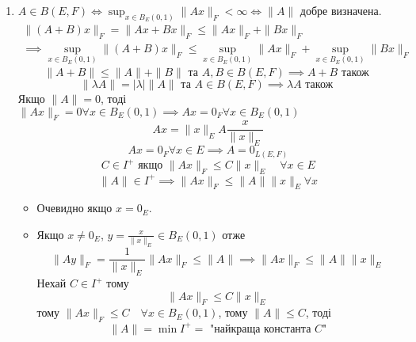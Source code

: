 \begin{preuve}
   \begin{enumerate}
       \item $A \in B(E, F) \iff \sup_{x \in B_{E}(0, 1)} \|Ax\|_{F} < \infty \iff \|A\|$ добре визначена.
           \begin{align*}
               \|(A + B)x\|_F = \|Ax + Bx\|_F \le \|Ax\|_F + \|Bx\|_F\\ \implies \sup_{x \in B_E(0, 1)} \|(A + B)x\|_F \le \sup_{x \in B_E(0, 1)} \|Ax\|_F + \sup_{x \in B_E(0, 1)} \|Bx\|_F
           \end{align*}
           \[
               \|A + B\| \le \|A\| + \|B\| \text{ та } A, B \in B(E, F) \implies A + B \text{ також }
           \] 
           \[
           \|\lambda A\| = |\lambda|\|A\| \text{ та } A \in B(E, F) \implies \lambda A \text{ також }
           \] 
           Якщо $\|A\| = 0$, тоді $\|Ax\|_F = 0 \forall x \in B_E(0, 1) \implies Ax = 0_F \forall x \in B_E(0, 1)$
           \[
           Ax = \|x\|_E A \frac{x}{\|x\|_E}
           \] 
           \[
           Ax = 0_F \forall x \in E \implies A = 0_{L(E, F)}
           \] 
           \[
           C \in I^+ \text{ якщо } \|Ax\|_F \le C\|x\|_E \quad \forall x \in E
           \] 
           \[
           \|A\| \in I^+ \implies \|Ax\|_F \le \|A\|\|x\|_E \forall x
           \] 
           \begin{itemize}
               \item Очевидно якщо $x = 0_E$.
               \item Якщо $x \neq 0_E$, $y = \frac{x}{\|x\|_E} \in B_E(0, 1)$ отже
                   \[
                       \|Ay\|_F = \frac{1}{\|x\|_E}\|Ax\|_F \le \|A\| \implies \|Ax\|_F \le \|A\|\|x\|_E

                   \] 
                   Нехай $C \in I^+$ тому  
                   \[
                   \|Ax\|_F \le C\|x\|_E
                   \] 
                   тому $\|Ax\|_F \le C \quad \forall x \in B_E(0,1)$, тому $\|A\| \le C$, тоді 
                   \[
                       \|A\| = \min I^+ = \text{ "найкраща константа $C$"}
                   \] 
           \end{itemize}
   \end{enumerate} 
\end{preuve}

